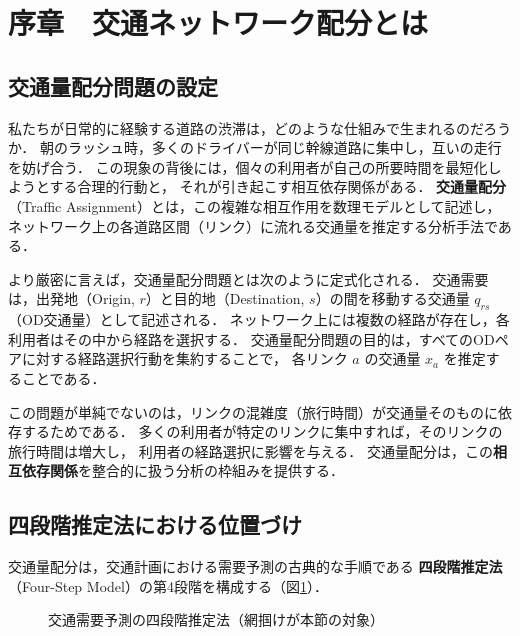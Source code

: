 
\section*{序章　交通ネットワーク配分とは}

\subsection*{交通量配分問題の設定}

私たちが日常的に経験する道路の渋滞は，どのような仕組みで生まれるのだろうか．
朝のラッシュ時，多くのドライバーが同じ幹線道路に集中し，互いの走行を妨げ合う．
この現象の背後には，個々の利用者が自己の所要時間を最短化しようとする合理的行動と，
それが引き起こす相互依存関係がある．
\textbf{交通量配分}（Traffic Assignment）とは，この複雑な相互作用を数理モデルとして記述し，
ネットワーク上の各道路区間（リンク）に流れる交通量を推定する分析手法である\cite{土木学会1998,Sheffi1985}．

より厳密に言えば，交通量配分問題とは次のように定式化される．
交通需要は，出発地（Origin, $r$）と目的地（Destination, $s$）の間を移動する交通量
$q_{rs}$（OD交通量）として記述される．
ネットワーク上には複数の経路が存在し，各利用者はその中から経路を選択する．
交通量配分問題の目的は，すべてのODペアに対する経路選択行動を集約することで，
各リンク $a$ の交通量 $x_a$ を推定することである．

この問題が単純でないのは，リンクの混雑度（旅行時間）が交通量そのものに依存するためである．
多くの利用者が特定のリンクに集中すれば，そのリンクの旅行時間は増大し，
利用者の経路選択に影響を与える．
交通量配分は，この\textbf{相互依存関係}を整合的に扱う分析の枠組みを提供する．

\subsection*{四段階推定法における位置づけ}

交通量配分は，交通計画における需要予測の古典的な手順である
\textbf{四段階推定法}（Four-Step Model）の第4段階を構成する（図\ref{fig:4stages}）\cite{土木学会1998}．

\begin{figure}[tb]
  \centering
  
  \caption{交通需要予測の四段階推定法（網掴けが本節の対象）}
  \label{fig:4stages}
\end{figure}

